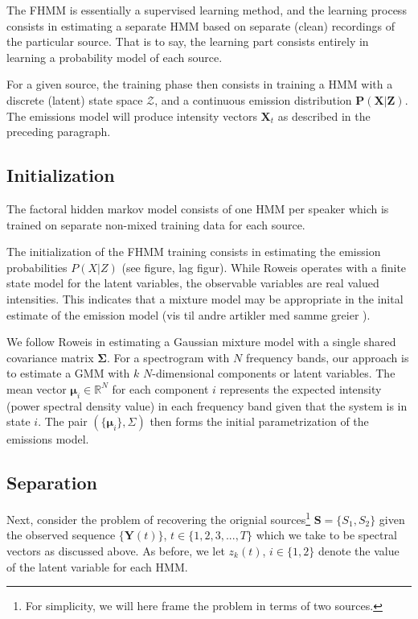 \documentclass[11pt, oneside, a4paper]{report}
\begin{document}
The FHMM is essentially a supervised learning method, and the learning
process consists in estimating a separate HMM based on separate (clean) recordings of the
particular source. That is to say, the learning part consists entirely
in learning a probability model of each source. 

For a given source, the training phase then consists in
training a HMM with a discrete (latent) state space $\mathcal{Z}$, and
a continuous emission distribution $\mathbf{P(X|Z)}$. The emissions
model will produce intensity vectors $\mathbf{X}_t$ as described in
the preceding paragraph.



\subsection{Initialization}

The factoral hidden markov model consists of one HMM per speaker which
is trained on separate non-mixed training data for each source. 

The initialization of the FHMM training consists in estimating the
emission probabilities $P(X|Z)$ (see figure, lag figur). While Roweis
operates with a finite state model for the latent variables, the
observable variables are real valued intensities. This indicates that
a mixture model may be appropriate in the inital estimate of the
emission model (vis til andre artikler med samme greier ). 

We follow Roweis in estimating a Gaussian mixture model with a single
shared covariance matrix $\mathbf{\Sigma}$. For a spectrogram with $N$ frequency bands,
our approach is to estimate a GMM with $k$ $N$-dimensional components
or latent variables. The mean vector $\mathbf{\mu}_i\in\mathbb{R}^N$ for
each component $i$ represents the expected intensity (power spectral
density value) in each frequency band given that the system is in
state $i$. The pair $(\{\mathbf{\mu}_i\}, \Sigma)$ then forms the initial
parametrization of the emissions model.




\subsection{Separation}

Next, consider the problem of recovering the orignial
sources\footnote{For simplicity, we will here frame the problem in
  terms of two sources.} $\mathbf{S} =
\{S_1, S_2\}$ given the observed sequence $\{\mathbf{Y}(t)\}$, $t \in \{1,2,3,...,T\}$ which we
take to be spectral vectors as discussed above. As before, we let
$z_k(t)$, $i \in \{1,2\}$ denote the value of the latent variable for
each HMM. 
\end{document}
